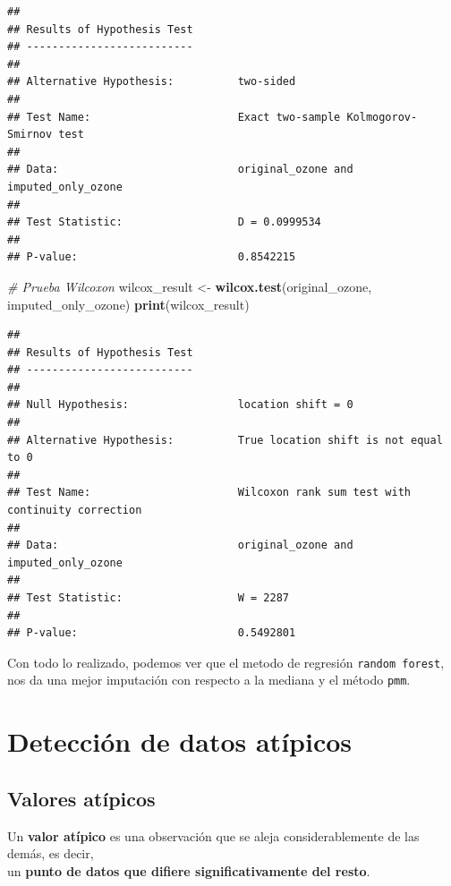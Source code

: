 \documentclass[
]{book}
\newenvironment{Shaded}{\begin{snugshade}}{\end{snugshade}}
\newcommand{\CommentTok}[1]{\textcolor[rgb]{0.56,0.35,0.01}{\textit{#1}}}
\newcommand{\FunctionTok}[1]{\textcolor[rgb]{0.13,0.29,0.53}{\textbf{#1}}}
\newcommand{\NormalTok}[1]{#1}
\newcommand{\OtherTok}[1]{\textcolor[rgb]{0.56,0.35,0.01}{#1}}
\begin{document}
\begin{verbatim}
## 
## Results of Hypothesis Test
## --------------------------
## 
## Alternative Hypothesis:          two-sided
## 
## Test Name:                       Exact two-sample Kolmogorov-Smirnov test
## 
## Data:                            original_ozone and imputed_only_ozone
## 
## Test Statistic:                  D = 0.0999534
## 
## P-value:                         0.8542215
\end{verbatim}

\begin{Shaded}
\begin{Highlighting}[]
\CommentTok{\# Prueba Wilcoxon}
\NormalTok{wilcox\_result }\OtherTok{\textless{}{-}} \FunctionTok{wilcox.test}\NormalTok{(original\_ozone, imputed\_only\_ozone)}
\FunctionTok{print}\NormalTok{(wilcox\_result)}
\end{Highlighting}
\end{Shaded}

\begin{verbatim}
## 
## Results of Hypothesis Test
## --------------------------
## 
## Null Hypothesis:                 location shift = 0
## 
## Alternative Hypothesis:          True location shift is not equal to 0
## 
## Test Name:                       Wilcoxon rank sum test with continuity correction
## 
## Data:                            original_ozone and imputed_only_ozone
## 
## Test Statistic:                  W = 2287
## 
## P-value:                         0.5492801
\end{verbatim}

Con todo lo realizado, podemos ver que el metodo de regresión \texttt{random\ forest}, nos da una mejor imputación con respecto a la mediana y el método \texttt{pmm}.

\section{Detección de datos atípicos}\label{detecciuxf3n-de-datos-atuxedpicos}

\subsection{Valores atípicos}\label{valores-atuxedpicos}

Un \textbf{valor atípico} es una observación que se aleja considerablemente de las demás, es decir,\\
un \textbf{punto de datos que difiere significativamente del resto}.
\end{document}
